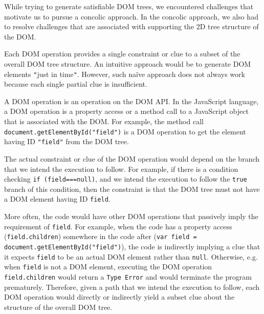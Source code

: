 

While trying to generate satisfiable DOM trees, we encountered challenges that motivate us to pursue a concolic approach.  
In the concolic approach, we also had to resolve challenges that are associated with supporting the 2D tree structure of the DOM.  

Each DOM operation provides a single constraint or clue to a subset of the overall DOM tree structure.  An intuitive approach would be to generate DOM elements {\tt "}just in time{\tt "}.  
However, such na\"ive approach does not always work because each single partial clue is insufficient.  

A DOM operation is an operation on the DOM API.  In the JavaScript language, a DOM operation is a property access or a method call to a JavaScript object that is associated with the DOM.  
For example, the method call {\tt document.getElementById("field")} is a DOM operation to get the element having ID {\tt "field"} from the DOM tree.  

The actual constraint or clue of the DOM operation would depend on the branch that we intend the execution to follow.  
For example, if there is a condition checking {\tt if (field===null)}, and we intend the execution to follow the {\tt true} branch of this condition,  
then the constraint is that the DOM tree must not have a DOM element having ID {\tt field}.  

More often, the code would have other DOM operations that passively imply the requirement of {\tt field}.  
For example, when the code has a property access ({\tt field.children}) somewhere in the code after ({\tt var field = document.getElementById("field")}), 
the code is indirectly implying a clue that it expects {\tt field} to be an actual DOM element rather than {\tt null}.  
Otherwise, e.g. when {\tt field} is not a DOM element, executing the DOM operation {\tt field.children} would return a {\tt Type Error} and would terminate the program prematurely.    
Therefore, given a path that we intend the execution to follow, each DOM operation would directly or indirectly yield a subset clue about the structure of the overall DOM tree.  

